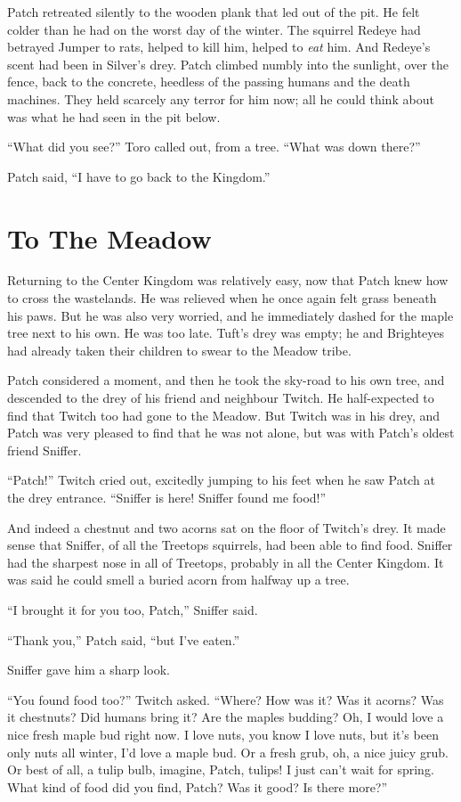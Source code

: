 \documentclass[ebook,oneside,openany,17pt]{memoir}
\renewcommand{\thechapter}{\Roman{chapter}}
\newcounter{sections}
\newcommand{\sections}[1]{%
  \section*{#1}
  \addtocounter{sections}{1}%
  \pdfbookmark[1]{#1}{section.\thechapter.\thesections}}
\begin{document}
Patch retreated silently to the wooden plank that led out of the
pit. He felt colder than he had on the worst day of the winter. The
squirrel Redeye had betrayed Jumper to rats, helped to kill him,
helped to \emph{eat} him. And Redeye’s scent had been in Silver’s
drey. Patch climbed numbly into the sunlight, over the fence, back to
the concrete, heedless of the passing humans and the death
machines. They held scarcely any terror for him now; all he could
think about was what he had seen in the pit below.

“What did you see?” Toro called out, from a tree. “What was down
there?”

Patch said, “I have to go back to the Kingdom.”


\sections{To The Meadow}

Returning to the Center Kingdom was relatively easy, now that Patch
knew how to cross the wastelands. He was relieved when he once again
felt grass beneath his paws. But he was also very worried, and he
immediately dashed for the maple tree next to his own. He was too
late. Tuft’s drey was empty; he and Brighteyes had already taken their
children to swear to the Meadow tribe.

Patch considered a moment, and then he took the sky-road to his own
tree, and descended to the drey of his friend and neighbour Twitch. He
half-expected to find that Twitch too had gone to the Meadow. But
Twitch was in his drey, and Patch was very pleased to find that he was
not alone, but was with Patch’s oldest friend Sniffer.

“Patch!” Twitch cried out, excitedly jumping to his feet when he saw
Patch at the drey entrance. “Sniffer is here! Sniffer found me food!”

And indeed a chestnut and two acorns sat on the floor of Twitch’s
drey. It made sense that Sniffer, of all the Treetops squirrels, had
been able to find food. Sniffer had the sharpest nose in all of
Treetops, probably in all the Center Kingdom. It was said he could
smell a buried acorn from halfway up a tree.

“I brought it for you too, Patch,” Sniffer said.

“Thank you,” Patch said, “but I’ve eaten.”

Sniffer gave him a sharp look.

“You found food too?” Twitch asked. “Where? How was it? Was it acorns?
Was it chestnuts? Did humans bring it? Are the maples budding?  Oh, I
would love a nice fresh maple bud right now. I love nuts, you know I
love nuts, but it’s been only nuts all winter, I’d love a maple
bud. Or a fresh grub, oh, a nice juicy grub. Or best of all, a tulip
bulb, imagine, Patch, tulips! I just can’t wait for spring. What kind
of food did you find, Patch? Was it good? Is there more?”
\end{document}
